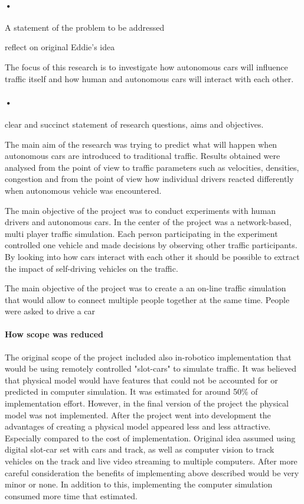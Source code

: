 \documentclass[11pt,english]{article}
\begin{document}
\paragraph{•}
A statement of the problem to be addressed

reflect on original Eddie's idea


The focus of this research is to investigate how autonomous cars will influence traffic itself and how human and autonomous cars will interact with each other.




\paragraph{•}
clear and succinct statement of research questions, aims and objectives.


The main aim of the research was trying to predict what will happen when autonomous cars are introduced to traditional traffic. Results obtained were analysed from the point of view to traffic parameters such as velocities, densities, congestion and from the point of view how individual drivers reacted differently when autonomous vehicle was encountered.

The main objective of the project was to conduct experiments with human drivers and autonomous cars. In the center of the project was a network-based, multi player traffic simulation. Each person participating in the experiment controlled one vehicle and made decisions by observing other traffic participants. By looking into how cars interact with each other it should be possible to extract the impact of self-driving vehicles on the traffic. 



The main objective of the project was to create a an on-line traffic simulation that would allow to connect multiple people together at the same time. People were asked to drive a car 

\paragraph{How scope was reduced}

The original scope of the project included also in-robotico implementation that would be using remotely controlled "slot-cars" to simulate traffic. It was believed that physical model would have features that could not be accounted for or predicted in computer simulation. It was estimated for around 50\% of implementation effort. However, in the final version of the project the physical model was not implemented. After the project went into development the advantages of creating a physical model appeared less and less attractive. Especially compared to the cost of implementation. Original idea assumed using digital slot-car set with cars and track, as well as computer vision to track vehicles on the track and live video streaming to multiple computers. After more careful consideration the benefits of implementing above described would be very minor or none. In addition to this, implementing the computer simulation consumed more time that estimated. 
\end{document}
